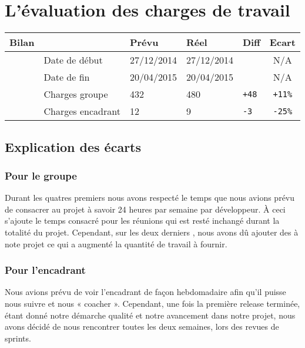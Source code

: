 \section{L'évaluation des charges de travail}
\begin{tabular}{|l|p{2.6cm}|p{2.6cm}|p{2.3cm}|p{2.3cm}|c|}
	\hline
	\textbf{Bilan} & & \textbf{Prévu} & \textbf{Réel} & \textbf{Diff}& \textbf{Ecart}\\
	\hline
	& Date de début &27/12/2014 &27/12/2014&&N/A\\
	\hline
	& Date de fin &20/04/2015 &20/04/2015&&N/A\\
	\hline
	& Charges groupe &432 &480&\texttt{+48}&\texttt{+11\%}\\
	\hline
	& Charges encadrant &12 &9&\texttt{-3}&\texttt{-25\%}\\
	\hline
\end{tabular}

\subsection{Explication des écarts}
\subsubsection{Pour le groupe}
Durant les quatres premiers \Sprints nous avons respecté le temps que nous avions prévu de consacrer au projet à savoir 24 heures par semaine par
développeur. À ceci s'ajoute le temps consacré pour les réunions qui est resté inchangé durant la totalité du projet. Cependant, sur les deux derniers
\Sprints, nous
avons dû ajouter des \Stories à note projet ce qui a augmenté la quantité de travail à fournir.

\subsubsection{Pour l'encadrant}
Nous avions prévu de voir l'encadrant de façon hebdomadaire afin qu'il puisse nous suivre et nous « coacher ». Cependant, une fois la première release
terminée, étant donné notre démarche qualité et notre avancement dans notre projet, nous avons décidé de nous rencontrer toutes les deux semaines, lors
des revues de sprints.

